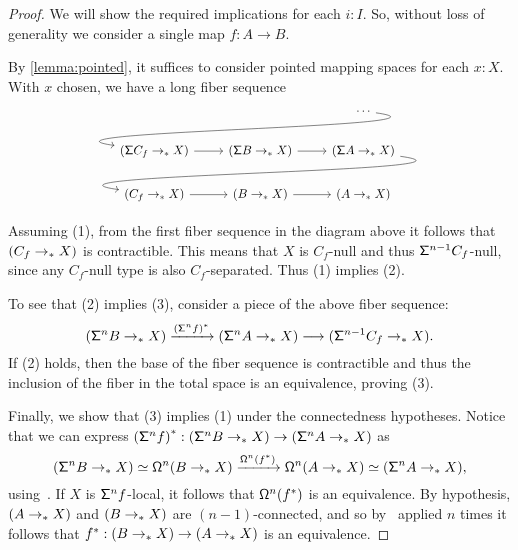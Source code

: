 \begin{proof}
We will show the required implications for each $i : I$.
So, without loss of generality we consider a single map $f : A \to B$.

By \cref{lemma:pointed}, it suffices to consider pointed mapping
spaces for each $x : X$.
With $x$ chosen, we have a long fiber sequence
\begin{equation*}
\begin{tikzcd}
& & \cdots \arrow[dll,out=352,in=172] \\
(\suspsym C_f \pto X) \arrow[r] & (\suspsym B \pto X) \arrow[r] & (\suspsym A \pto X) \arrow[dll,out=352,in=172] \\
(C_f \pto X) \arrow[r] & (B\pto X) \arrow[r] & (A\pto X)
\end{tikzcd}
\end{equation*}

Assuming (1), from the first fiber sequence in the diagram above
it follows that $(C_f \to_{\ast} X)$ is contractible. This means that $X$ is $C_f$-null and
thus $\mathsf{\Sigma}^{n-1} C_f$-null, since any $C_f$-null type is also $C_f$-separated. Thus (1) implies (2).

To see that (2) implies (3), consider a piece of the above fiber sequence:
\[
  (\mathsf{\Sigma}^{n} B \to_{\ast} X) \xrightarrow{{(\mathsf{\Sigma}^n f)}^\ast}
  (\mathsf{\Sigma}^n A\to_{\ast} X) \longrightarrow (\mathsf{\Sigma}^{n-1} C_f \to_{\ast} X).
\]
If (2) holds, then the base of the fiber sequence is contractible and thus the inclusion of the
fiber in the total space
is an equivalence, proving (3).

Finally, we show that (3) implies (1) under the connectedness hypotheses.
Notice that we can express
${(\mathsf{\Sigma}^{n} f)}^\ast : (\mathsf{\Sigma}^n B \to_{\ast} X) \to (\mathsf{\Sigma}^n A \to_{\ast} X)$ as
\[
    (\mathsf{\Sigma}^n B\to_{\ast} X) \simeq \mathsf{\Omega}^n(B \to_{\ast} X) \xrightarrow{\mathsf{\Omega}^n ({f}^\ast)}
    \mathsf{\Omega}^n(A \to_{\ast} X) \simeq (\mathsf{\Sigma}^n A \to_{\ast} X),
\]
using~\cite[Lemma~6.5.4]{hottbook}.
If $X$ is $\mathsf{\Sigma}^{n}f$-local, it follows that $\mathsf{\Omega}^n ({f}^\ast)$ is an equivalence.
By hypothesis, $(A\to_{\ast} X)$ and $(B\to_{\ast} X)$ are $(n-1)$-connected, and so by~\cite[Corollary~8.8.2]{hottbook} applied $n$ times
it follows that ${f}^\ast : (B \to_{\ast} X) \to (A \to_{\ast} X)$ is an equivalence.
\end{proof}


